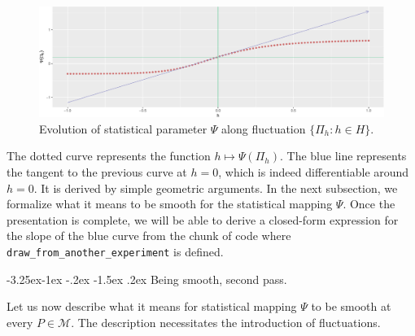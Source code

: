 \documentclass[]{article}
\makeatletter
\newenvironment{Shaded}{\begin{snugshade}}{\end{snugshade}}
\newcommand{\DataTypeTok}[1]{\textcolor[rgb]{0.13,0.29,0.53}{#1}}
\newcommand{\DecValTok}[1]{\textcolor[rgb]{0.00,0.00,0.81}{#1}}
\newcommand{\KeywordTok}[1]{\textcolor[rgb]{0.13,0.29,0.53}{\textbf{#1}}}
\newcommand{\NormalTok}[1]{#1}
\newcommand{\OperatorTok}[1]{\textcolor[rgb]{0.81,0.36,0.00}{\textbf{#1}}}
\newcommand{\StringTok}[1]{\textcolor[rgb]{0.31,0.60,0.02}{#1}}
\renewcommand\subsection{\@startsection{subsection}{3}{\z@}%
                                     {-3.25ex\@plus -1ex \@minus -.2ex}%
                                     {-1.5ex \@plus .2ex}%
                                     {\normalfont\normalsize\bfseries}}
\newcommand{\calM}{\mathcal{M}}
\theoremstyle{definition}
\theoremstyle{definition}
\theoremstyle{definition}
\theoremstyle{remark}
\makeatother
\begin{document}
\begin{Shaded}
\end{Shaded}

\begin{figure}
\centering
\includegraphics{img/psi-approx-psi-one-1.pdf}
\caption{\label{fig:psi-approx-psi-one}Evolution of statistical parameter
\(\Psi\) along fluctuation \(\{\Pi_{h} : h \in H\}\).}
\end{figure}

The dotted curve represents the function \(h \mapsto \Psi(\Pi_{h})\).
The blue line represents the tangent to the previous curve at \(h=0\),
which is indeed differentiable around \(h=0\). It is derived by simple
geometric arguments. In the next subsection, we formalize what it means
to be smooth for the statistical mapping \(\Psi\). Once the presentation
is complete, we will be able to derive a closed-form expression for the
slope of the blue curve from the chunk of code where
\texttt{draw\_from\_another\_experiment} is defined.

\subsection{\textdbend Being smooth, second pass.}
\label{subsec:being:smooth:two}

Let us now describe what it means for statistical mapping \(\Psi\) to be
smooth at every \(P \in \calM\). The description necessitates the
introduction of fluctuations.
\end{document}
